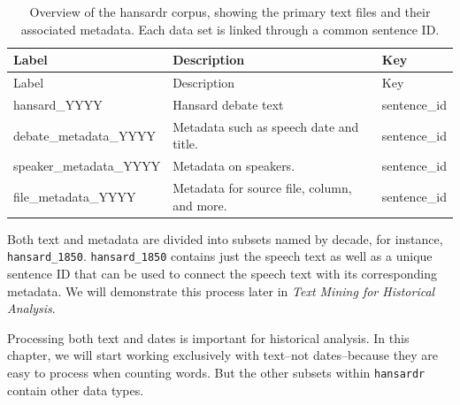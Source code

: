\documentclass[
]{article}
\newcounter{chapter}
\begin{document}
\begin{longtable}[]{@{}
  >{\raggedright\arraybackslash}p{}
  >{\raggedright\arraybackslash}p{}
  >{\raggedright\arraybackslash}p{}@{}}
\caption{Overview of the hansardr corpus, showing the primary text files
and their associated metadata. Each data set is linked through a common
sentence ID.}\tabularnewline
\toprule\noalign{}
\begin{minipage}[b]{\linewidth}\raggedright
Label
\end{minipage} & \begin{minipage}[b]{\linewidth}\raggedright
Description
\end{minipage} & \begin{minipage}[b]{\linewidth}\raggedright
Key
\end{minipage} \\
\midrule\noalign{}
\endfirsthead
\toprule\noalign{}
\begin{minipage}[b]{\linewidth}\raggedright
Label
\end{minipage} & \begin{minipage}[b]{\linewidth}\raggedright
Description
\end{minipage} & \begin{minipage}[b]{\linewidth}\raggedright
Key
\end{minipage} \\
\midrule\noalign{}
\endhead
\bottomrule\noalign{}
\endlastfoot
hansard\_YYYY & Hansard debate text & sentence\_id \\
debate\_metadata\_YYYY & Metadata such as speech date and title. &
sentence\_id \\
speaker\_metadata\_YYYY & Metadata on speakers. & sentence\_id \\
file\_metadata\_YYYY & Metadata for source file, column, and more. &
sentence\_id \\
\end{longtable}

Both text and metadata are divided into subsets named by decade, for
instance, \texttt{hansard\_1850}. \texttt{hansard\_1850} contains just
the speech text as well as a unique sentence ID that can be used to
connect the speech text with its corresponding metadata. We will
demonstrate this process later in \emph{Text Mining for Historical
Analysis}.

Processing both text and dates is important for historical analysis. In
this chapter, we will start working exclusively with text--not
dates--because they are easy to process when counting words. But the
other subsets within \texttt{hansardr} contain other data types.
\end{document}
